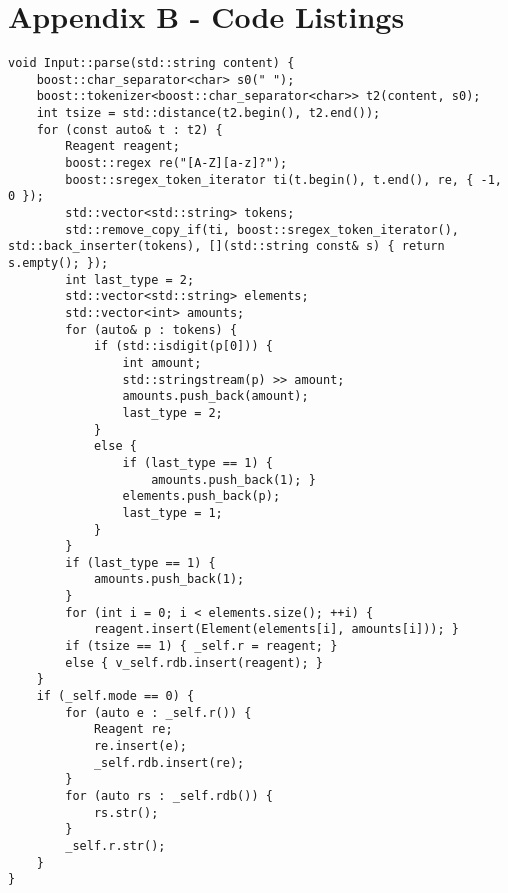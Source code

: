 

\appendix
\label{app:b}
\vspace*{-10mm}
\chapter*{Appendix B - Code Listings}
\label{ch:code}

\begin{lstlisting}[caption={Input parse function}, label={lst:parse}]
void Input::parse(std::string content) {
    boost::char_separator<char> s0(" ");
    boost::tokenizer<boost::char_separator<char>> t2(content, s0);
    int tsize = std::distance(t2.begin(), t2.end());
    for (const auto& t : t2) {
        Reagent reagent;
        boost::regex re("[A-Z][a-z]?");
        boost::sregex_token_iterator ti(t.begin(), t.end(), re, { -1, 0 });
        std::vector<std::string> tokens;
        std::remove_copy_if(ti, boost::sregex_token_iterator(), std::back_inserter(tokens), [](std::string const& s) { return s.empty(); });
        int last_type = 2;
        std::vector<std::string> elements;
        std::vector<int> amounts;
        for (auto& p : tokens) {
            if (std::isdigit(p[0])) {
                int amount;
                std::stringstream(p) >> amount;
                amounts.push_back(amount);
                last_type = 2;
            }
            else {
                if (last_type == 1) {
                    amounts.push_back(1); }
                elements.push_back(p);
                last_type = 1;
            }
        }
        if (last_type == 1) {
            amounts.push_back(1);
        }
        for (int i = 0; i < elements.size(); ++i) { 
            reagent.insert(Element(elements[i], amounts[i])); }
        if (tsize == 1) { _self.r = reagent; }
        else { v_self.rdb.insert(reagent); }
    }
    if (_self.mode == 0) {
        for (auto e : _self.r()) {
            Reagent re;
            re.insert(e);
            _self.rdb.insert(re);
        }
        for (auto rs : _self.rdb()) {
            rs.str();
        }
        _self.r.str();
    }
}
\end{lstlisting}



\clearpage